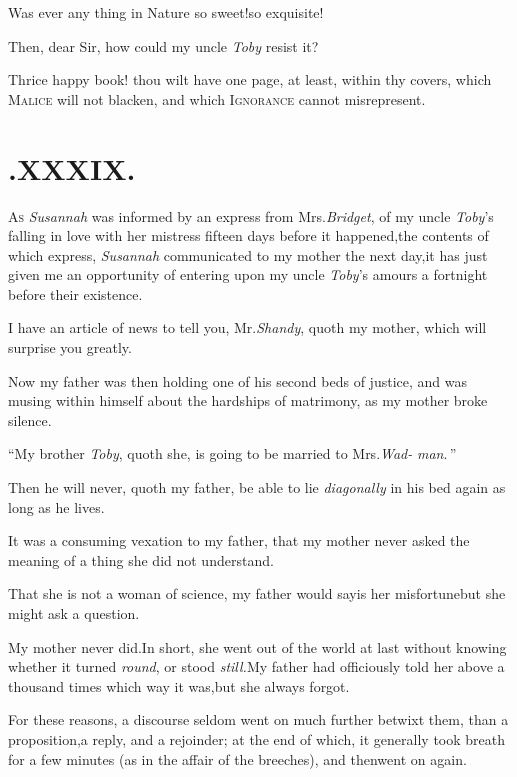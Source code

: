 \documentclass{article}
\begin{document}
\newpage
\hbox{}
\newpage
\tsh Was ever any thing in Nature so sweet!\tsk so
exquisite!

\tsh Then, dear Sir, how could my uncle \textit{Toby}
resist it?

Thrice happy book! thou wilt have one page, at least, within thy
covers, which \textsc{Malice} will not blacken, and which
\textsc{Ignorance} cannot misrepresent.

\section{.\enspace XXXIX.}

\lettrine{A}{s} \textit{Susannah} was informed by an
express from Mrs.\@ \textit{Bridget}, of my uncle \textit{Toby}’s
falling in love with her mistress fifteen days before it
happened,\break\tsk the contents of which express, \textit{Susannah}
communicated to my mother the next day,\tsk it has just given me
an opportunity of entering upon my uncle \textit{Toby}’s amours
a fortnight before their existence.

\newpage
I have an article of news to tell you, Mr.\@ \textit{Shandy}, quoth
my mother, which will surprise you greatly.\tsh

Now my father was then holding one of his second beds of
justice, and was musing within himself about the hardships of
matrimony, as my mother broke silence.\tsh

“\tsk My brother \textit{Toby}, quoth she,\break
\lqq is going to be married to Mrs.\@ \textit{Wad-}\break
\lqq \textit{man}.\,”

\tsh Then he will never, quoth my father, be able to
lie \textit{diagonally} in his bed again as long as he lives.

It was a consuming vexation to my father, that my mother never
asked the meaning of a thing she did not understand.

\newpage
\tsh That she is not a woman of science, my father
would say\tsk is her misfortune\tsk but she might ask a
question.\tsk 

My mother never did.\tsh In short, she went out of the
world at last without knowing whether it turned \textit{round}, or
stood \textit{still.}\tsh My father had officiously told her
above a thousand times which way it was,\tsk but she always
forgot.

For these reasons, a discourse seldom went on much further
betwixt them, than a proposition,\tsk a reply, and a rejoinder;
at the end of which, it generally took breath for a few minutes (as
in the affair of the breeches), and then\break went on again.
\end{document}
